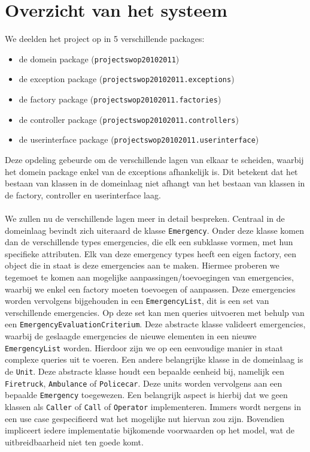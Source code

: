\section{Overzicht van het systeem}
\label{overzicht}
We deelden het project op in 5 verschillende packages:
\begin{itemize}
 \item de domein package (\verb+projectswop20102011+)
 \item de exception package (\verb+projectswop20102011.exceptions+)
 \item de factory package (\verb+projectswop20102011.factories+)
 \item de controller package (\verb+projectswop20102011.controllers+)
 \item de userinterface package (\verb+projectswop20102011.userinterface+)
\end{itemize}
Deze opdeling gebeurde om de verschillende lagen van elkaar te scheiden, waarbij het domein package enkel van de exceptions afhankelijk is. Dit betekent dat het bestaan van klassen in de domeinlaag niet afhangt van het bestaan van klassen in de factory, controller en userinterface laag.
\paragraph{}
We zullen nu de verschillende lagen meer in detail bespreken. Centraal in de domeinlaag bevindt zich uiteraard de klasse \verb+Emergency+. Onder deze klasse komen dan de verschillende types emergencies, die elk een subklasse vormen, met hun specifieke attributen. Elk van deze emergency types heeft een eigen factory, een object die in staat is deze emergencies aan te maken. Hiermee proberen we tegemoet te komen aan mogelijke aanpassingen/toevoegingen van emergencies, waarbij we enkel een factory moeten toevoegen of aanpassen. Deze emergencies worden vervolgens bijgehouden in een \verb+EmergencyList+, dit is een set van verschillende emergencies. Op deze set kan men queries uitvoeren met behulp van een \verb+EmergencyEvaluationCriterium+. Deze abstracte klasse valideert emergencies, waarbij de geslaagde emergencies de nieuwe elementen in een nieuwe \verb+EmergencyList+ worden. Hierdoor zijn we op een eenvoudige manier in staat complexe queries uit te voeren. Een andere belangrijke klasse in de domeinlaag is de \verb+Unit+. Deze abstracte klasse houdt een bepaalde eenheid bij, namelijk een \verb+Firetruck+, \verb+Ambulance+ of \verb+Policecar+. Deze units worden vervolgens aan een bepaalde \verb+Emergency+ toegewezen. Een belangrijk aspect is hierbij dat we geen klassen als \verb+Caller+ of \verb+Call+ of \verb+Operator+ implementeren. Immers wordt nergens in een use case gespecifieerd wat het mogelijke nut hiervan zou zijn. Bovendien impliceert iedere implementatie bijkomende voorwaarden op het model, wat de uitbreidbaarheid niet ten goede komt.
